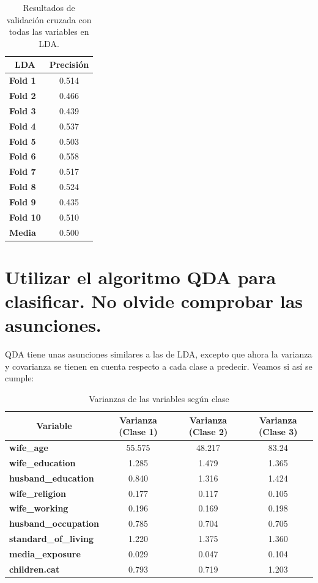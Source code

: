 \documentclass[a4paper,12pt, oneside]{book}
\begin{document}
\begin{table}[H]
\centering
\begin{tabular}{@{}lc@{}}
\toprule
\multicolumn{1}{c}{\textbf{LDA}} & \textbf{Precisión} \\ \midrule
\textbf{Fold 1} & 0.514 \\
\textbf{Fold 2} & 0.466 \\
\textbf{Fold 3} & 0.439 \\
\textbf{Fold 4} & 0.537 \\
\textbf{Fold 5} & 0.503 \\
\textbf{Fold 6} & 0.558 \\
\textbf{Fold 7} & 0.517 \\
\textbf{Fold 8} & 0.524 \\
\textbf{Fold 9} & 0.435 \\
\textbf{Fold 10} & 0.510 \\
\textbf{Media} & 0.500 \\ \bottomrule
\end{tabular}
\caption{Resultados de validación cruzada con todas las variables en LDA.}
\label{tab:lda}
\end{table}



\section[QDA para clasificación.]{Utilizar el algoritmo QDA para clasificar. No olvide comprobar las asunciones.}
QDA tiene unas asunciones similares a las de LDA, excepto que ahora la varianza y covarianza se tienen en cuenta respecto a cada clase a predecir. Veamos si así se cumple:

\begin{table}[H]
\begin{tabular}{@{}lccc@{}}
\toprule
\multicolumn{1}{c}{\textbf{Variable}} & \textbf{Varianza (Clase 1)} & \textbf{Varianza (Clase 2)} & \textbf{Varianza (Clase 3)} \\ \midrule
\textbf{wife\_age} & 55.575 & 48.217 & 83.24 \\
\textbf{wife\_education} & 1.285 & 1.479 & 1.365 \\
\textbf{husband\_education} & 0.840 & 1.316 & 1.424 \\
\textbf{wife\_religion} & 0.177 & 0.117 & 0.105 \\
\textbf{wife\_working} & 0.196 & 0.169 & 0.198 \\
\textbf{husband\_occupation} & 0.785 & 0.704 & 0.705 \\
\textbf{standard\_of\_living} & 1.220 & 1.375 & 1.360 \\
\textbf{media\_exposure} & 0.029 & 0.047 & 0.104 \\
\textbf{children.cat} & 0.793 & 0.719 & 1.203 \\ \bottomrule
\end{tabular}
\caption{Varianzas de las variables según clase}
\label{tab:checkqda}
\end{table}
\end{document}
